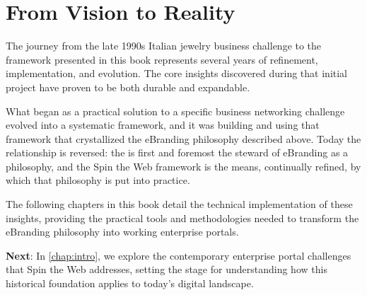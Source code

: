 \section{From Vision to Reality}

The journey from the late 1990s Italian jewelry business challenge to the framework presented in this book represents several years of refinement, implementation, and evolution. The core insights discovered during that initial project have proven to be both durable and expandable.

What began as a practical solution to a specific business networking challenge evolved into a systematic framework, and it was building and using that framework that crystallized the eBranding philosophy described above. Today the relationship is reversed: the \organization{} is first and foremost the steward of eBranding as a philosophy, and the Spin the Web framework is the means, continually refined, by which that philosophy is put into practice.

The following chapters in this book detail the technical implementation of these insights, providing the practical tools and methodologies needed to transform the eBranding philosophy into working enterprise portals.

\textbf{Next}: In \cref{chap:intro}, we explore the contemporary enterprise portal challenges that Spin the Web addresses, setting the stage for understanding how this historical foundation applies to today's digital landscape.
